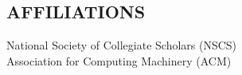 \documentclass[margin]{res}
\begin{document}
\begin{resume}
\section{AFFILIATIONS}             
                National Society of Collegiate Scholars (NSCS) \\
                Association for Computing Machinery (ACM)
            
\end{resume}
\end{document}
